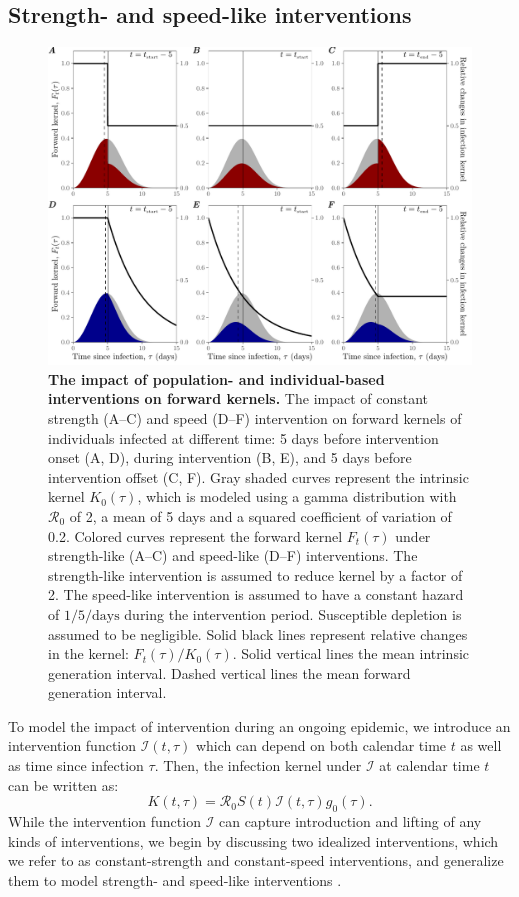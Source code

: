 \documentclass[12pt]{article}
\newcommand{\Rx}[1]{\ensuremath{{\mathcal R}_{#1}}\xspace}
\newcommand{\Ro}{\Rx{0}}
\newcommand{\II}{\ensuremath{\mathcal I}}
\begin{document}
\subsection{Strength- and speed-like interventions}

\begin{figure}[!th]
\includegraphics[width=1\textwidth]{pop_ind_compare.pdf}
\caption{
\textbf{The impact of population- and individual-based interventions on forward kernels.}
The impact of constant strength (A--C) and speed (D--F) intervention on forward kernels of individuals infected at different time:
5 days before intervention onset (A, D), during intervention (B, E), and 5 days before intervention offset (C, F).
Gray shaded curves represent the intrinsic kernel $K_0(\tau)$, which is modeled using a gamma distribution with $\Ro$ of 2, a mean of 5 days and a squared coefficient of variation of 0.2.
Colored curves represent the forward kernel $F_t(\tau)$ under strength-like (A--C) and speed-like (D--F) interventions.
The strength-like intervention is assumed to reduce kernel by a factor of 2.
The speed-like intervention is assumed to have a constant hazard of $1/5/\textrm{days}$ during the intervention period.
Susceptible depletion is assumed to be negligible.
Solid black lines represent relative changes in the kernel: $F_t(\tau)/K_0(\tau)$.
Solid vertical lines the mean intrinsic generation interval.
Dashed vertical lines the mean forward generation interval.
}
\label{fig:indpop}
\end{figure}

To model the impact of intervention during an ongoing epidemic, we introduce an intervention function $\II(t, \tau)$ which can depend on both calendar time $t$ as well as time since infection $\tau$. Then, the infection kernel under  $\II$ at calendar time $t$ can be written as:
\begin{equation}
K(t, \tau) = \Ro S(t) \II(t, \tau) g_0(\tau).
\end{equation}
While the intervention function $\II$ can capture introduction and lifting of any kinds of interventions, we begin by discussing two idealized interventions, which we refer to as constant-strength and constant-speed interventions, and generalize them to model strength- and speed-like interventions \citep{dushoff2021speed}.
\end{document}
